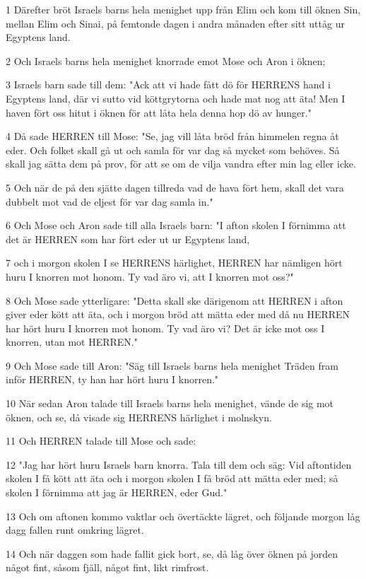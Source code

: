 \par 1 Därefter bröt Israels barns hela menighet upp från Elim och kom till öknen Sin, mellan Elim och Sinai, på femtonde dagen i andra månaden efter sitt uttåg ur Egyptens land.
\par 2 Och Israels barns hela menighet knorrade emot Mose och Aron i öknen;
\par 3 Israels barn sade till dem: "Ack att vi hade fått dö för HERRENS hand i Egyptens land, där vi sutto vid köttgrytorna och hade mat nog att äta! Men I haven fört oss hitut i öknen för att låta hela denna hop dö av hunger."
\par 4 Då sade HERREN till Mose: "Se, jag vill låta bröd från himmelen regna åt eder. Och folket skall gå ut och samla för var dag så mycket som behöves. Så skall jag sätta dem på prov, för att se om de vilja vandra efter min lag eller icke.
\par 5 Och när de på den sjätte dagen tillreda vad de hava fört hem, skall det vara dubbelt mot vad de eljest för var dag samla in."
\par 6 Och Mose och Aron sade till alla Israels barn: "I afton skolen I förnimma att det är HERREN som har fört eder ut ur Egyptens land,
\par 7 och i morgon skolen I se HERRENS härlighet, HERREN har nämligen hört huru I knorren mot honom. Ty vad äro vi, att I knorren mot oss?"
\par 8 Och Mose sade ytterligare: "Detta skall ske därigenom att HERREN i afton giver eder kött att äta, och i morgon bröd att mätta eder med då nu HERREN har hört huru I knorren mot honom. Ty vad äro vi? Det är icke mot oss I knorren, utan mot HERREN."
\par 9 Och Mose sade till Aron: "Säg till Israels barns hela menighet Träden fram inför HERREN, ty han har hört huru I knorren."
\par 10 När sedan Aron talade till Israels barns hela menighet, vände de sig mot öknen, och se, då visade sig HERRENS härlighet i molnskyn.
\par 11 Och HERREN talade till Mose och sade:
\par 12 "Jag har hört huru Israels barn knorra. Tala till dem och säg: Vid aftontiden skolen I få kött att äta och i morgon skolen I få bröd att mätta eder med; så skolen I förnimma att jag är HERREN, eder Gud."
\par 13 Och om aftonen kommo vaktlar och övertäckte lägret, och följande morgon låg dagg fallen runt omkring lägret.
\par 14 Och när daggen som hade fallit gick bort, se, då låg över öknen på jorden något fint, såsom fjäll, något fint, likt rimfrost.
